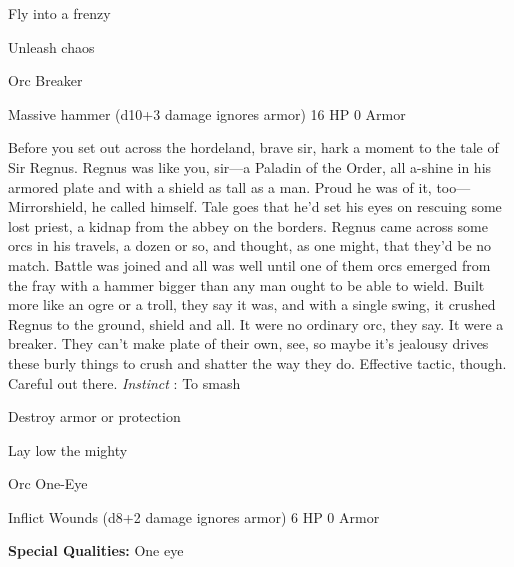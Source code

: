 \startitemize[1,packed]
         
\item Fly into a frenzy

         
\item Unleash chaos

       
\stopitemize
       
\startMonsterName
Orc Breaker	 
\stopMonsterName
       

Massive hammer (d10+3 damage ignores armor)	16 HP	0 Armor

       


       
\startMonsterDescription
Before you set out across the hordeland, brave sir, hark a moment to the tale of Sir Regnus. Regnus was like you, sir—a Paladin of the Order, all a-shine in his armored plate and with a shield as tall as a man. Proud he was of it, too—Mirrorshield, he called himself. Tale goes that he’d set his eyes on rescuing some lost priest, a kidnap from the abbey on the borders. Regnus came across some orcs in his travels, a dozen or so, and thought, as one might, that they’d be no match. Battle was joined and all was well until one of them orcs emerged from the fray with a hammer bigger than any man ought to be able to wield. Built more like an ogre or a troll, they say it was, and with a single swing, it crushed Regnus to the ground, shield and all. It were no ordinary orc, they say. It were a breaker. They can’t make plate of their own, see, so maybe it’s jealousy drives these burly things to crush and shatter the way they do. Effective tactic, though. Careful out there. {\em Instinct} : To smash
\stopMonsterDescription
       
\startitemize[1,packed]
         
\item Destroy armor or protection

         
\item Lay low the mighty

       
\stopitemize
       
\startMonsterName
Orc One-Eye	 
\stopMonsterName
       

Inflict Wounds (d8+2 damage ignores armor)	6 HP	0 Armor

       


       
\startMonsterQualities
         {\bf Special Qualities:}  One eye
\stopMonsterQualities
       
